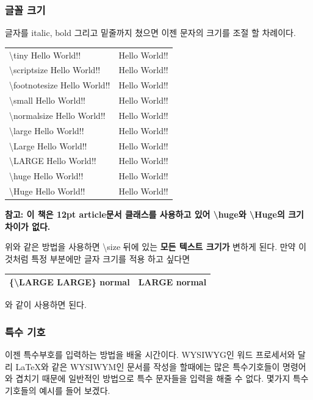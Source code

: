 \documentclass[12pt]{article}
\begin{document}
	\subsubsection{글꼴 크기}
	글자를 italic, bold 그리고 밑줄까지 쳤으면 이젠 문자의 크기를 조절 할 차례이다.\newline
	
	\begin{tabularx}{\textwidth \onehalfspacing}{|X|X|}
		\hline
		\textbackslash tiny Hello World!! & \tiny Hello World!!\\
		\textbackslash scriptsize Hello World!! & \scriptsize Hello World!!\\
		\textbackslash footnotesize Hello World!! & \footnotesize Hello World!!\\
		\textbackslash small Hello World!! & \small Hello World!!\\
		\textbackslash normalsize Hello World!! & \normalsize Hello World!!\\
		\textbackslash large Hello World!! & \large Hello World!!\\
		\textbackslash Large Hello World!! & \Large Hello World!!\\
		\textbackslash LARGE Hello World!! & \LARGE Hello World!!\\
		\textbackslash huge Hello World!! & \huge Hello World!!\\
		\textbackslash Huge Hello World!! & \Huge Hello World!!\\
		\hline
	\end{tabularx}
	\newline
	\newline
	\textbf{참고: 이 책은 12pt article문서 클래스를 사용하고 있어 \textbackslash huge와 \textbackslash Huge의 크기 차이가 없다.}
	
	위와 같은 방법을 사용하면 \textbackslash size 뒤에 있는 {\bf 모든 텍스트 크기가} 변하게 된다. 만약 {\large 이것처럼} 특정 부분에만 글자 크기를 적용 하고 싶다면 \newline
	
	\begin{tabularx}{\textwidth \doublespacing}{ |X|X| }
		\hline
		\{\textbackslash LARGE LARGE\} normal & {\LARGE LARGE} normal\\
		\hline
	\end{tabularx}
	\newline
	\newline
	와 같이 사용하면 된다.
	\subsubsection{특수 기호}
	이젠 특수부호를 입력하는 방법을 배울 시간이다. WYSIWYG인 워드 프로세서와 달리 \LaTeX 와 같은 WYSIWYM인 문서를 작성을 할때에는 많은 특수기호들이 명령어와 겹치기 때문에 일반적인 방법으로 특수 문자들을 입력을 해줄 수 없다. 몇가지 특수기호들의 예시를 들어 보겠다.\newline
	
\end{document}
